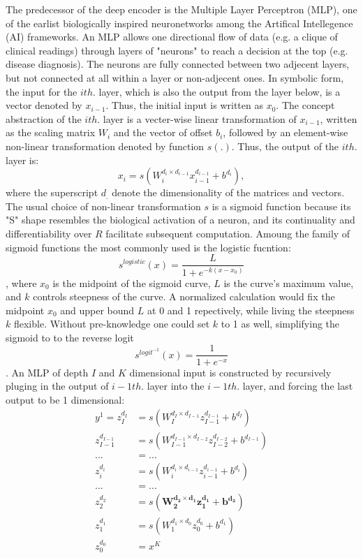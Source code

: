 \documentclass[twocolumn]{article}
\begin{document}
The predecessor of the deep encoder is the Multiple Layer Perceptron (MLP), one of the earlist biologically inspired neuronetworks among the Artifical Intellegence (AI) frameworks. An MLP allows one directional flow of data (e.g. a clique of clinical readings) through layers of "neurons" to reach a decision at the top (e.g. disease diagnosis). The neurons are fully connected between two adjecent layers, but not connected at all within a layer or non-adjecent ones. In symbolic form, the input for the $i th.$ layer, which is also the output from the layer below, is a vector denoted by $x_{i-1}$. Thus, the initial input is written as $x_0$. The concept abstraction of the $i th.$ layer is a vecter-wise linear transformation of $x_{i-1}$, written as the scaling matrix $W_i$ and the vector of offset $b_i$, followed by an element-wise non-linear transformation denoted by function $s(.)$. Thus, the output of the $i th.$ layer is:
\[x_i=s(W_i^{d_i\times d_{i-1}}x_{i-1}^{d_{i-1}}+b^{d_i}),\]
where the superscript $d_.$ denote the dimensionality of the matrices and vectors.
The usual choice of non-linear transformation $s$ is a sigmoid function because its "S" shape resembles the biological activation of a neuron, and its continuality and differentiability over $R$ facilitate subsequent computation. Amoung the family of sigmoid functions the most commonly used is the logistic fucntion: 
\[s^{logistic}(x)=\frac{L}{1+e^{-k(x-x_0)}}\],
where $x_0$ is the midpoint of the sigmoid curve, $L$ is the curve's maximum value, and $k$ controls steepness of the curve. A normalized calculation would fix the midpoint $x_0$ and upper bound $L$ at 0 and 1 repectively, while living the steepness $k$ flexible. Without pre-knowledge one could set $k$ to 1 as well, simplifying the sigmoid to to the reverse logit 
\[s^{logit^{-1}}(x)=\frac{1}{1+e^{-x}}\].
An MLP of depth  $I$ and $K$ dimensional input is constructed by recursively pluging in the output of $i-1 th.$ layer into the $i-1 th.$ layer, and forcing the last output to be 1 dimensional:
\begin{equation} \label{eq_MLP}
\begin{split}
  y^1=z_I^{d_I} &= s(W_I^{d_I\times d_{I-1}}z_{I-1}^{d_{I-1}}+b^{d_I}) \\
  z_{I-1}^{d_{I-1}} &= s(W_{I-1}^{d_{I-1}\times d_{I-2}}z_{I-2}^{d_{I-2}}+b^{d_{I-1}}) \\
  ... &= ... \\
  z_i^{d_i} &= s(W_i^{d_i\times d_{i-1}}z_{i-1}^{d_{i-1}}+b^{d_i}) \\
  ... &= ... \\
  z_2^{d_2} &= s(\boldsymbol{W_2^{d_2\times d_1}z_1^{d_1}}+\boldsymbol{b^{d_2}}) \\
  z_1^{d_1} &= s(W_1^{d_1\times d_0}z_0^{d_0}+b^{d_1}) \\
  z_0^{d_0} &= x^K
\end{split}
\end{equation}
\end{document}
